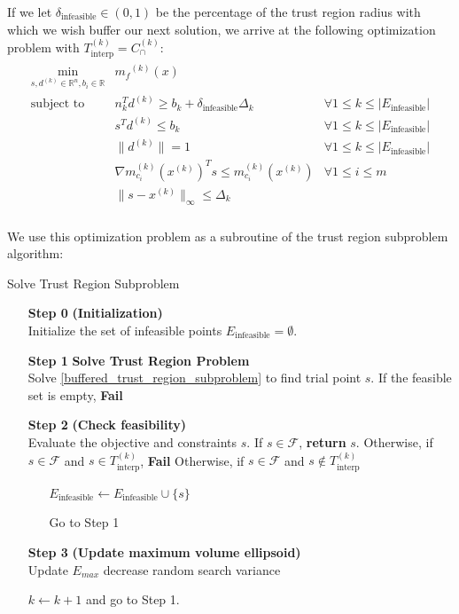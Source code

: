 \documentclass{article}
\theoremstyle{case}
\numberwithin{theorem}{subsection}
\newcommand{\capcones}{{C^{(k)}_{\cap}}}
\newcommand{\dk}{\Delta_k}
\newcommand{\feasible}{{\mathcal F}}
\newcommand{\mcik}{{{m}^{(k)}_{c_i}}}
\newcommand{\mfk}{{{m}_f}^{(k)}}
\newcommand{\reals}{\mathbb R}
\newcommand{\Rn}{\mathbb R^n}
\newcommand{\sampletrk}{{T_{\text{interp}}^{(k)}}}
\newcommand{\trsinfset}{{E_\textrm{infeasible}}}
\newcommand{\trstol}{{\delta_\textrm{infeasible}}}
\newcommand{\xk}{{x^{(k)}}}
\begin{document}
If we let $\trstol \in (0, 1)$ be the percentage of the trust region radius with which we wish buffer our next solution, 
we arrive at the following optimization problem with $\sampletrk = \capcones$:
\begin{align}
\label{buffered_trust_region_subproblem}
\begin{array}{ccc}
\min_{s, d^{(k)} \in \Rn, b_i \in \reals}	& \mfk(x) & 	\\
 \mbox{subject to}  & n_k^Td^{(k)} \ge b_k + \trstol \dk& \forall 1 \le k \le |\trsinfset | \\
 & s^T d^{(k)} \le b_k &   \forall 1 \le k \le |\trsinfset |  \\
 & \|d^{(k)}\| = 1 & \forall 1 \le k \le |\trsinfset |	\\
 & \nabla \mcik(\xk) ^T s \le \mcik(\xk) & \forall 1 \le i \le m\\
 & \|s - \xk \|_{\infty} \le \dk & \\
\end{array}
\end{align}

We use this optimization problem as a subroutine of the trust region subproblem algorithm:

\begin{algorithm}[H]
    \caption{Solve Trust Region Subproblem}
    \label{linear_cut_trust_region_subproblem}
    \begin{itemize}
        \item[\textbf{Step 0}] \textbf{(Initialization)} \\
	    Initialize the set of infeasible points $\trsinfset = \emptyset$.
        
        \item[\textbf{Step 1}] \textbf{Solve Trust Region Problem} \\
	    Solve \cref{buffered_trust_region_subproblem} to find trial point $s$.
	    If the feasible set is empty, \textbf{Fail}
        
        \item[\textbf{Step 2}] \textbf{(Check feasibility)} \\
            Evaluate the objective and constraints $s$.
            If $s\in\feasible$, \textbf{return} $s$.
            Otherwise, if $s\in\feasible$ and $s \in \sampletrk$, \textbf{Fail}
	    Otherwise, if $s\in\feasible$ and $s \not \in \sampletrk$ \begin{itemize}
	    	\item[] $\trsinfset \gets \trsinfset \cup \{s\}$
	    	\item[] Go to Step 1
	    \end{itemize}
            
        \item[\textbf{Step 3}] \textbf{(Update maximum volume ellipsoid)} \\
	    Update $E_{max}$
	    decrease random search variance
            
        $k \gets k+1$ and go to Step 1.
    \end{itemize}
\end{algorithm}
\end{document}
